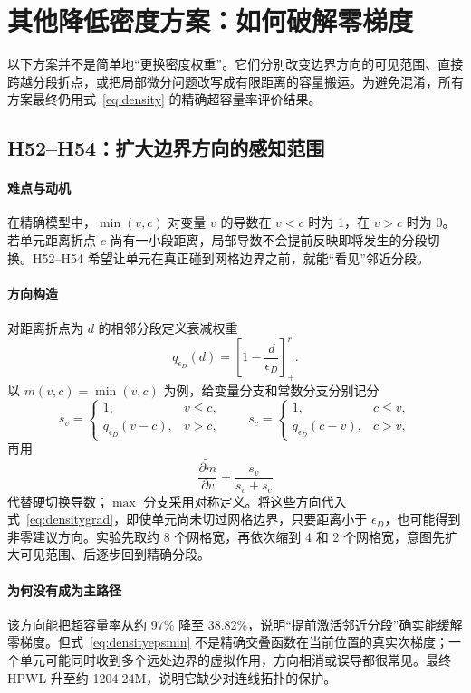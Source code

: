 \documentclass[UTF8,a4paper,11pt]{ctexrep}
\begin{document}
\section{其他降低密度方案：如何破解零梯度}
以下方案并不是简单地“更换密度权重”。它们分别改变边界方向的可见范围、直接跨越分段折点，或把局部微分问题改写成有限距离的容量搬运。为避免混淆，所有方案最终仍用式~\eqref{eq:density} 的精确超容量率评价结果。

\subsection{H52--H54：扩大边界方向的感知范围}
\paragraph{难点与动机}
在精确模型中，$\min(v,c)$ 对变量 $v$ 的导数在 $v<c$ 时为 1，在 $v>c$ 时为 0。若单元距离折点 $c$ 尚有一小段距离，局部导数不会提前反映即将发生的分段切换。H52--H54 希望让单元在真正碰到网格边界之前，就能“看见”邻近分段。

\paragraph{方向构造}
对距离折点为 $d$ 的相邻分段定义衰减权重
\begin{equation}
 q_{\epsilon_D}(d)=\left[1-\frac{d}{\epsilon_D}\right]_+^r. \label{eq:densityepsweight}
\end{equation}
以 $m(v,c)=\min(v,c)$ 为例，给变量分支和常数分支分别记分
\begin{equation}
 s_v=\begin{cases}1,&v\le c,\\q_{\epsilon_D}(v-c),&v>c,\end{cases}
 \qquad
 s_c=\begin{cases}1,&c\le v,\\q_{\epsilon_D}(c-v),&c>v,
 \end{cases}
\end{equation}
再用
\begin{equation}
 \widetilde{\frac{\partial m}{\partial v}}
 =\frac{s_v}{s_v+s_c} \label{eq:densityepsmin}
\end{equation}
代替硬切换导数；$\max$ 分支采用对称定义。将这些方向代入式~\eqref{eq:densitygrad}，即使单元尚未切过网格边界，只要距离小于 $\epsilon_D$，也可能得到非零建议方向。实验先取约 8 个网格宽，再依次缩到 4 和 2 个网格宽，意图先扩大可见范围、后逐步回到精确分段。

\paragraph{为何没有成为主路径}
该方向能把超容量率从约 97\% 降至 38.82\%，说明“提前激活邻近分段”确实能缓解零梯度。但式~\eqref{eq:densityepsmin} 不是精确交叠函数在当前位置的真实次梯度；一个单元可能同时收到多个远处边界的虚拟作用，方向相消或误导都很常见。最终 HPWL 升至约 1204.24M，说明它缺少对连线拓扑的保护。
\end{document}
